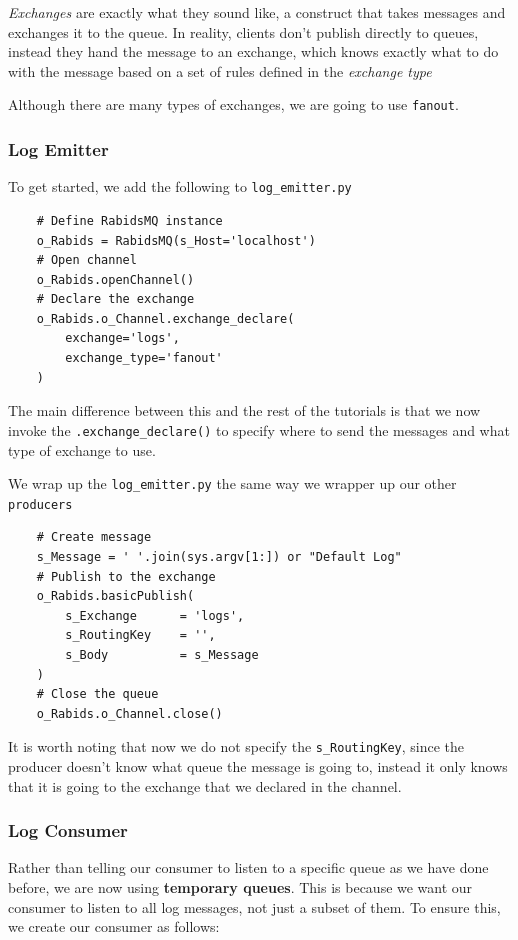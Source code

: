 \documentclass{article}
\begin{document}
\textit{Exchanges} are exactly what they sound like, a construct that takes messages and exchanges it to the queue. In reality, clients don't publish directly to queues, instead they hand the message to an exchange, which knows exactly what to do with the message based on a set of rules defined in the \textit{exchange type}

Although there are many types of exchanges, we are going to use \verb|fanout|. 

\subsubsection{Log Emitter}

To get started, we add the following to \verb|log_emitter.py|

\begin{verbatim}
    # Define RabidsMQ instance
    o_Rabids = RabidsMQ(s_Host='localhost')
    # Open channel
    o_Rabids.openChannel()
    # Declare the exchange
    o_Rabids.o_Channel.exchange_declare(
        exchange='logs',
        exchange_type='fanout'
    )
\end{verbatim}

The main difference between this and the rest of the tutorials is that we now invoke the \verb|.exchange_declare()| to specify where to send the messages and what type of exchange to use.

We wrap up the \verb|log_emitter.py| the same way we wrapper up our other \verb|producers|

\begin{verbatim}
    # Create message
    s_Message = ' '.join(sys.argv[1:]) or "Default Log"
    # Publish to the exchange
    o_Rabids.basicPublish(
        s_Exchange      = 'logs',
        s_RoutingKey    = '',
        s_Body          = s_Message
    )
    # Close the queue
    o_Rabids.o_Channel.close()
\end{verbatim}

It is worth noting that now we do not specify the \verb|s_RoutingKey|, since the producer doesn't know what queue the message is going to, instead it only knows that it is going to the exchange that we declared in the channel.

\subsubsection{Log Consumer}

Rather than telling our consumer to listen to a specific queue as we have done before, we are now using \textbf{temporary queues}. This is because we want our consumer to listen to all log messages, not just a subset of them. To ensure this, we create our consumer as follows:
\end{document}
